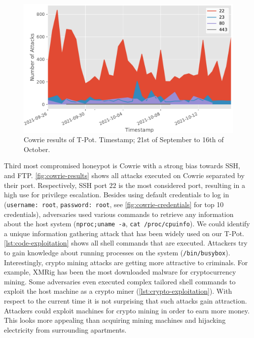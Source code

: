 \begin{figure}[ht]
    \centering
    \includegraphics[width=\textwidth]{figures/tpot-cowrie-port.pdf}
    \caption[Cowrie results of T-Pot]{
        Cowrie results of T-Pot.
        Timestamp; 21st of September to 16th of October.
    }
    \label{fig:cowrie-results}
\end{figure}

Third most compromised honeypot is Cowrie with a strong bias towards SSH, and FTP.
\autoref{fig:cowrie-results} shows all attacks executed on Cowrie separated by their port.
Respectively, SSH port $22$ is the most considered port, resulting in a high use for privilege escalation.
Besides using default credentials to log in (\verb|username: root|, \verb|password: root|, see \autoref{fig:cowrie-credentials} for top 10 credentials), adversaries used various commands to retrieve any information about the host system (\verb|nproc;uname -a|, \verb|cat /proc/cpuinfo|).
We could identify a unique information gathering attack that has been widely used on our T-Pot.
\autoref{lst:code-exploitation} shows all shell commands that are executed.
Attackers try to gain knowledge about running processes on the system (\verb|/bin/busybox|).
Interestingly, crypto mining attacks are getting more attractive to criminals.
For example, XMRig has been the most downloaded malware for cryptocurrency mining.
Some adversaries even executed complex tailored shell commands to exploit the host machine as a crypto miner (\autoref{lst:crypto-exploitation}).
With respect to the current time it is not surprising that such attacks gain attraction.
Attackers could exploit machines for crypto mining in order to earn more money.
This looks more appealing than acquiring mining machines and hijacking electricity from surrounding apartments.

